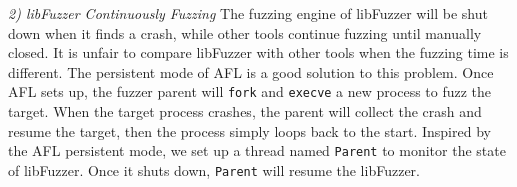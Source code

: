 \textit{2) libFuzzer Continuously Fuzzing}
The fuzzing engine of libFuzzer  will be shut down when it finds a crash, while other tools continue fuzzing until manually closed. It is unfair to compare libFuzzer  with other tools when the fuzzing time is different.
The persistent mode of AFL is a good solution to this problem. Once AFL sets up, the fuzzer parent will \texttt{fork} and \texttt{execve} a new process to fuzz the target. When the target process crashes, the parent will collect the crash and resume the target, then the process simply loops back to the start.
Inspired by the AFL persistent mode, we set up a thread named \texttt{Parent} to monitor the state of libFuzzer. Once it shuts down, \texttt{Parent} will resume the libFuzzer. %

\begin{comment}
\subsubsection{Radamsa Effectively Working}
Radamsa is a widely used generation-based fuzzer. There are two key obstacles to using Radamsa effectively. 
Firstly, Radamsa requires some sample files of input data, but AFL family tools and libFuzzer do not need. 
Secondly, AFL and libFuzzer mutate seeds by coverage information, but Radamsa does not, to compare them in terms of coverage is unfair. %
However, according to the original experiments of Radamsa and Skyfire, they pair generation-based fuzzers with mutation-based fuzzers to solve the two problems. We follow their setup to pare Radamsa with AFL: when AFL is running, Radamsa periodically read seeds generated by AFL as inputs and generates lots of outputs which will be fed back to AFL. Radamsa and AFL are running alternately on one CPU core.
\end{comment}

